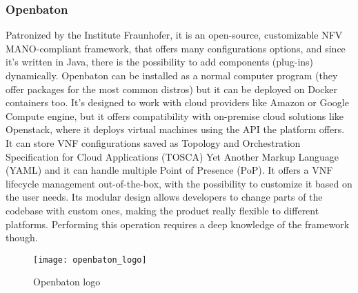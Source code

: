 \subsubsection{Openbaton}
\label{chap:prjan:sec:tech:sub:other:sub:openbaton}
Patronized by the Institute Fraunhofer, it is an open-source, customizable NFV
MANO-compliant framework, that offers many configurations options, and since
it's written in Java, there is the possibility to add components (plug-ins)
dynamically. Openbaton can be installed as a normal computer program (they offer
packages for the most common distros) but it can be deployed on Docker
containers too. It's designed to work with cloud providers like Amazon or Google
Compute engine, but it offers compatibility with on-premise cloud solutions like
Openstack, where it deploys virtual machines using the API the platform offers.
It can store VNF configurations saved as Topology and Orchestration
Specification for Cloud Applications (TOSCA) Yet Another Markup Language (YAML)
and it can handle multiple Point of Presence (PoP). It offers a VNF lifecycle
management out-of-the-box, with the possibility to customize it based on the
user needs. Its modular design allows developers to change parts of the codebase
with custom ones, making the product really flexible to different platforms.
Performing this operation requires a deep knowledge of the framework though.
\begin{figure}[h]
 \centering \texttt{[image: openbaton\_logo]}
 \caption{Openbaton logo}
 \label{chap:prjan:img:openbaton_logo}
\end{figure}
